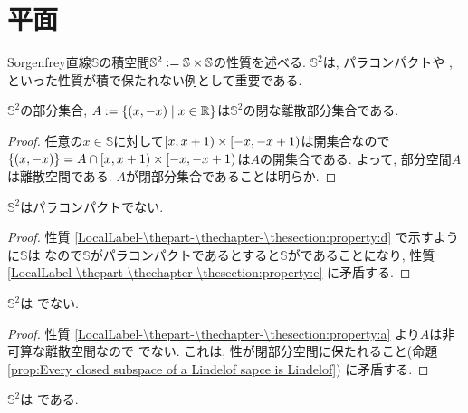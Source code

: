 \documentclass[uplatex, dvipdfmx, a4paper, 12pt, class=jsbook, crop=false]{standalone}
\begin{document}
\section{\Sorgenfrey 平面}
\label{example:Sorgenfrey-plane}

\newcommand{\bbS}{\mathbb{S}}
\newcommand{\locref}[1]{\ref{LocalLabel-\thepart-\thechapter-\thesection:#1}}
\newcommand{\loclabel}[1]{\label{LocalLabel-\thepart-\thechapter-\thesection:#1}}

Sorgenfrey直線$ \bbS $の積空間$ \bbS^{2} \defeq \bbS \times \bbS$の性質を述べる. $ \bbS^2 $は, パラコンパクトや \Lindelof , といった性質が積で保たれない例として重要である.

\begin{property}
	\loclabel{property:a}
	$ \bbS^2 $の部分集合, $ A \defeq \setcomp{(x, -x)}{x \in \R}$は$ \bbS^2 $の閉な離散部分集合である.
\end{property}

\begin{proof}
	任意の$ x \in \bbS $に対して$ \left[ x , x+1 \right) \times \left[ -x , -x+1 \right) $は開集合なので$ \{(x,-x)\} = A \cap \left[ x , x+1 \right) \times \left[ -x , -x+1 \right) $は$ A $の開集合である. よって, 部分空間$ A $は離散空間である. $ A $が閉部分集合であることは明らか.
\end{proof}

\begin{property}
	$ \bbS^2 $はパラコンパクトでない.
\end{property}

\begin{proof}
	性質 \locref{property:d} で示すように$ \bbS $は  なので$ \bbS $がパラコンパクトであるとすると$ \bbS $がであることになり, 性質 \locref{property:e} に矛盾する.
\end{proof}

\begin{property}
	$ \bbS^2 $は \Lindelof でない.
\end{property}

\begin{proof}
	性質 \locref{property:a} より$ A $は非可算な離散空間なので \Lindelof でない. これは, \Lindelof 性が閉部分空間に保たれること(命題 \ref{prop:Every closed subspace of a Lindelof sapce is Lindelof}) に矛盾する.
\end{proof}

\begin{property}
	\loclabel{property:d}
	$ \bbS^2 $は である.
\end{property}
\end{document}
